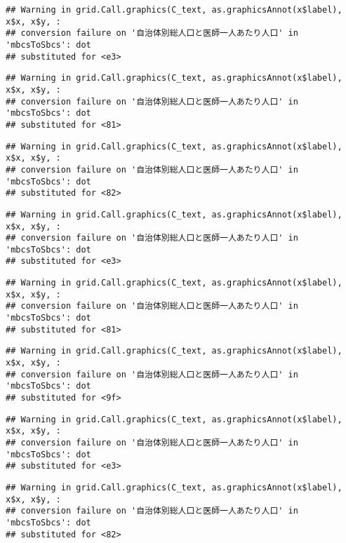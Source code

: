 \documentclass[
]{article}
\begin{document}
\begin{verbatim}
## Warning in grid.Call.graphics(C_text, as.graphicsAnnot(x$label), x$x, x$y, :
## conversion failure on '自治体別総人口と医師一人あたり人口' in 'mbcsToSbcs': dot
## substituted for <e3>
\end{verbatim}

\begin{verbatim}
## Warning in grid.Call.graphics(C_text, as.graphicsAnnot(x$label), x$x, x$y, :
## conversion failure on '自治体別総人口と医師一人あたり人口' in 'mbcsToSbcs': dot
## substituted for <81>
\end{verbatim}

\begin{verbatim}
## Warning in grid.Call.graphics(C_text, as.graphicsAnnot(x$label), x$x, x$y, :
## conversion failure on '自治体別総人口と医師一人あたり人口' in 'mbcsToSbcs': dot
## substituted for <82>
\end{verbatim}

\begin{verbatim}
## Warning in grid.Call.graphics(C_text, as.graphicsAnnot(x$label), x$x, x$y, :
## conversion failure on '自治体別総人口と医師一人あたり人口' in 'mbcsToSbcs': dot
## substituted for <e3>
\end{verbatim}

\begin{verbatim}
## Warning in grid.Call.graphics(C_text, as.graphicsAnnot(x$label), x$x, x$y, :
## conversion failure on '自治体別総人口と医師一人あたり人口' in 'mbcsToSbcs': dot
## substituted for <81>
\end{verbatim}

\begin{verbatim}
## Warning in grid.Call.graphics(C_text, as.graphicsAnnot(x$label), x$x, x$y, :
## conversion failure on '自治体別総人口と医師一人あたり人口' in 'mbcsToSbcs': dot
## substituted for <9f>
\end{verbatim}

\begin{verbatim}
## Warning in grid.Call.graphics(C_text, as.graphicsAnnot(x$label), x$x, x$y, :
## conversion failure on '自治体別総人口と医師一人あたり人口' in 'mbcsToSbcs': dot
## substituted for <e3>
\end{verbatim}

\begin{verbatim}
## Warning in grid.Call.graphics(C_text, as.graphicsAnnot(x$label), x$x, x$y, :
## conversion failure on '自治体別総人口と医師一人あたり人口' in 'mbcsToSbcs': dot
## substituted for <82>
\end{verbatim}
\end{document}
